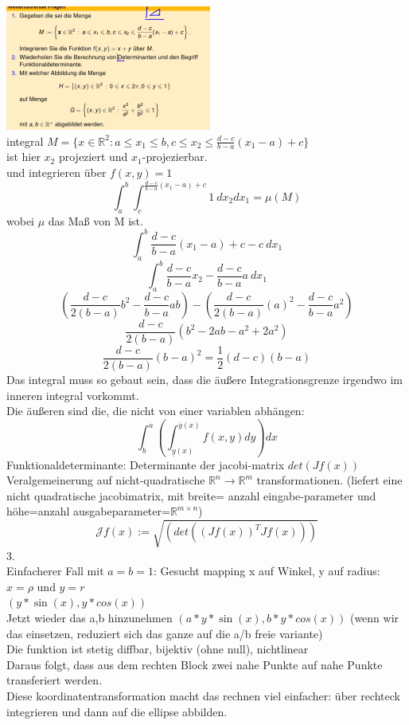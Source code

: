 \documentclass{article}
\begin{document}
	\includegraphics[width=256px]{selbststudium.png}\\
	integral $M=\{x\in\mathbb{R}^2:a\leq x_1\leq b, c\leq x_2 \leq \frac{d-c}{b-a}(x_1-a)+c\}$\\
	ist hier $x_2$ projeziert und $x_1$-projezierbar.\\
	und integrieren über $f(x,y)=1$\\
	$$\int ^b_a \int^{\frac{d-c}{b-a}(x_1-a)+c}_c 1\: dx_2dx_1 = \mu(M)$$
	wobei $\mu$ das Maß von M ist.\\
	$$\int ^b_a {\frac{d-c}{b-a}(x_1-a)+c}-c \: dx_1$$
	$$\int ^b_a \frac{d-c}{b-a}x_2-\frac{d-c}{b-a}a \: dx_1$$
	$$ (\frac{d-c}{2(b-a)}b^2-\frac{d-c}{b-a}ab)-(\frac{d-c}{2(b-a)}(a)^2-\frac{d-c}{b-a}a^2)$$
	$$ \frac{d-c}{2(b-a)}(b^2-2ab-a^2+2a^2)$$
	$$ \frac{d-c}{2(b-a)}(b-a)^2 = \frac{1}{2}(d-c)(b-a)$$
	Das integral muss so gebaut sein, dass die äußere Integrationsgrenze irgendwo im inneren integral vorkommt.\\
	Die äußeren sind die, die nicht von einer variablen abhängen:\\
	$$\int^a_b \left(\int ^{\overline{y}(x)}_{\underline{y}(x)}f(x,y)dy\right) dx$$
	Funktionaldeterminante: Determinante der jacobi-matrix $det(Jf(x))$\\
	Veralgemeinerung auf nicht-quadratische $\mathbb{R}^n\to \mathbb{R}^m$ transformationen. (liefert eine nicht quadratische jacobimatrix, mit breite= anzahl eingabe-parameter und höhe=anzahl ausgabeparameter=$\mathbb{R}^{m\times n}$)\\
	$$\mathcal{J}f(x):= \sqrt{(det((Jf(x))^TJf(x)))}$$
	3.\\
	Einfacherer Fall mit $a=b=1$: Gesucht mapping x auf Winkel, y auf radius:\\
	$x=\rho$ und $y=r$\\
	$(y*\sin(x),y*cos(x))$\\
	Jetzt wieder das a,b hinzunehmen $(a*y*\sin(x),b*y*cos(x))$ (wenn wir das einsetzen, reduziert sich das ganze auf die a/b freie variante)\\
	Die funktion ist stetig diffbar, bijektiv (ohne null), nichtlinear\\
	Daraus folgt, dass aus dem rechten Block zwei nahe Punkte auf nahe Punkte transferiert werden.\\
	Diese koordinatentransformation macht das rechnen viel einfacher: über rechteck integrieren und dann auf die ellipse abbilden.\\
\end{document}
